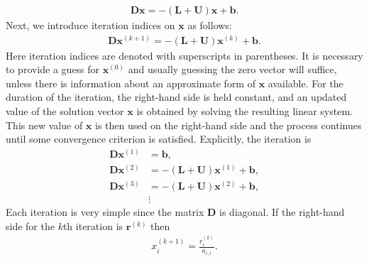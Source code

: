 \begin{align}
  \mathbf{Dx} = -( \mathbf{L} + \mathbf{U} ) \mathbf{x} + \mathbf{b} .
\end{align}
Next, we introduce iteration indices on $\mathbf{x}$ as follows:
\begin{align}
  \mathbf{D} \mathbf{x}^{(k+1)} = -( \mathbf{L} + \mathbf{U} ) \mathbf{x}^{(k)} + \mathbf{b} .
\end{align}
Here iteration indices are denoted with superscripts in parentheses. It is necessary to provide a guess for $\mathbf{x}^{(0)}$ and usually guessing the zero vector will suffice, unless there is information about an approximate form of $\mathbf{x}$ available. For the duration of the iteration, the right-hand side is held constant, and an updated value of the solution vector $\mathbf{x}$ is obtained by solving the resulting linear system. This new value of $\mathbf{x}$ is then used on the right-hand side and the process continues until some convergence criterion is satisfied. Explicitly, the iteration is
\begin{align}
  \mathbf{D} \mathbf{x}^{(1)} &=  \mathbf{b}, \nonumber \\
  \mathbf{D} \mathbf{x}^{(2)} &= -( \mathbf{L} + \mathbf{U} ) \mathbf{x}^{(1)} + \mathbf{b}, \nonumber \\
  \mathbf{D} \mathbf{x}^{(3)} &= -( \mathbf{L} + \mathbf{U} ) \mathbf{x}^{(2)} + \mathbf{b}, \nonumber \\
  &\vdots \nonumber
\end{align}
Each iteration is very simple since the matrix $\mathbf{D}$ is diagonal. If the right-hand side for the $k$th iteration is $\mathbf{r}^{(k)}$ then
\begin{align}
  x_i^{(k+1)} = \frac{r_i^{(k)}}{a_{i,i}} .
\end{align}

